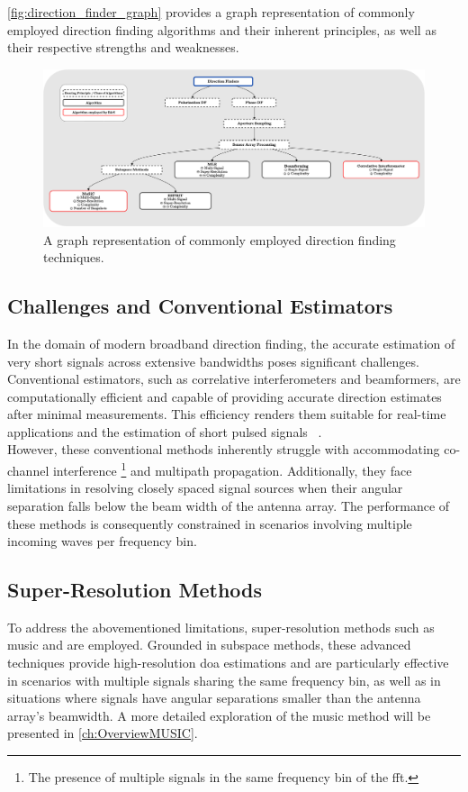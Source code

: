 \autoref{fig:direction_finder_graph} provides a graph representation of commonly employed direction finding algorithms
and their inherent principles, as well as their respective strengths and weaknesses.

\begin{figure}[H]
    \centering
    \includegraphics[width=1\textwidth]{figures/01_Introduction/direction_finder_graph.pdf}
    \caption{A graph representation of commonly employed direction finding techniques.}
    \label{fig:direction_finder_graph}
\end{figure}

\subsection{Challenges and Conventional Estimators}
In the domain of modern broadband direction finding, the accurate estimation of very short signals across extensive
bandwidths poses significant challenges. Conventional estimators, such as correlative interferometers and beamformers,
are computationally efficient and capable of providing accurate direction estimates after minimal measurements.
This efficiency renders them suitable for real-time applications and the estimation of short pulsed signals~%
\cite{meyer, tuncer.ch1, tuncer.ch2}.\\
However, these conventional methods inherently struggle with accommodating co-channel interference%
\footnote{The presence of multiple signals in the same frequency bin of the \gls{fft}.}
and multipath propagation. Additionally, they face limitations in resolving closely spaced signal sources when their
angular separation falls below the beam width of the antenna array. The performance of these methods is consequently
constrained in scenarios involving multiple incoming waves per frequency bin.\\

\subsection{Super-Resolution Methods} %
To address the abovementioned limitations, super-resolution methods such as \gls{music} and  are employed.
Grounded in subspace methods, these advanced techniques provide high-resolution \gls{doa} estimations and are
particularly effective in scenarios with multiple signals sharing the same frequency bin, as well as in situations where
signals have angular separations smaller than the antenna array's beamwidth. A more detailed exploration of the
\gls{music} method will be presented in \autoref{ch:OverviewMUSIC}.

